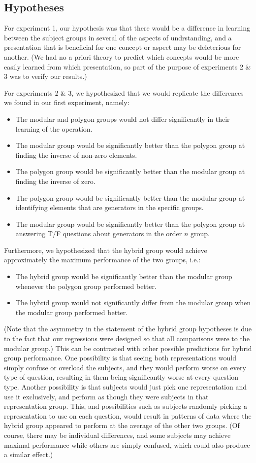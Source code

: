 \documentclass[man,10pt]{apa6}
\begin{document}
\subsection{Hypotheses}
For experiment 1, our hypothesis was that there would be a difference in learning between the subject groups in several of the aspects of undrstanding, and a presentation that is beneficial for one concept or aspect may be deleterious for another. (We had no a priori theory to predict which concepts would be more easily learned from which presentation, so part of the purpose of experiments 2 \& 3 was to verify our results.)\par
For experiments 2 \& 3, we hypothesized that we would replicate the differences we found in our first experiment, namely: 
\begin{itemize} 
\item The modular and polygon groups would not differ significantly in their learning of the operation.
\item The modular group would be significantly better than the polygon group at finding the inverse of non-zero elements.
\item The polygon group would be significantly better than the modular group at finding the inverse of zero.
\item The polygon group would be significantly better than the modular group at identifying elements that are generators in the specific groups.
\item The modular group would be significantly better than the polygon group at answering T/F questions about generators in the order $n$ group.
\end{itemize}
Furthermore, we hypothesized that the hybrid group would achieve approximately the maximum performance of the two groups, i.e.:
\begin{itemize}
\item The hybrid group would be significantly better than the modular group whenever the polygon group performed better.
\item The hybrid group would not significantly differ from the modular group when the modular group performed better.
\end{itemize}
(Note that the asymmetry in the statement of the hybrid group hypotheses is due to the fact that our regressions were designed so that all comparisons were to the modular group.) This can be contrasted with other possible predictions for hybrid group performance. One possibility is that seeing both representations would simply confuse or overload the subjects, and they would perform worse on every type of question, resulting in them being significantly worse at every question type. Another possibility is that subjects would just pick one representation and use it exclusively, and perform as though they were subjects in that representation group. This, and possibilities such as subjects randomly picking a representation to use on each question, would result in patterns of data where the hybrid group appeared to perform at the average of the other two groups. (Of course, there may be individual differences, and some subjects may achieve maximal performance while others are simply confused, which could also produce a similar effect.) \par
\end{document}
